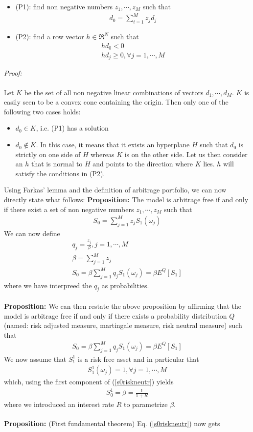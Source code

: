 \documentclass[a4paper,10pt]{report}
\theoremstyle{plain}
\theoremstyle{definition}
\newcommand\be{\begin{eqnarray}}    %
\newcommand\ee{\end{eqnarray}}
\newcommand{\PROP} {{\bf{Proposition: }}}
\newcommand{\PROOF} {{\emph{Proof: \\ \\}}}
\begin{document}
\begin{itemize}
\item (P1): find non negative numbers $z_1,\cdots, z_M$ such that 
\be 
d_0 = \sum_{i=1}^M z_j d_j
\ee
\item (P2): find a row vector $h\in \Re^N$ such that 
\be 
h d_0 <0 \\
h d_j \ge 0, \forall j=1,\cdots, M
\ee
\end{itemize} 
\PROOF Let $K$ be the set of all non negative linear combinations of vectors $d_1,\cdots, d_M$. $K$ is easily seen to be a convex cone containing the origin. Then only one of the following two cases holds:
\begin{itemize}
\item $d_0 \in K$, i.e. (P1) has a solution
\item  $d_0 \notin K$. In this case, it means that it exists an hyperplane $H$ such that $d_0$ is strictly on one side of $H$ whereas $K$ is on the other side. Let us then consider an $h$ that is normal to $H$ and points to the direction where $K$ lies. $h$ will satisfy the conditions in (P2).
\end{itemize}
Using Farkas' lemma and the definition of arbitrage portfolio, we can now directly state what follows:
\PROP The model is arbitrage free if and only if there exist a set of non negative numbers $z_1,\cdots, z_M$ such that 
\be 
S_0 = \sum_{j=1}^M z_j S_1(\omega_j)
\label{noarbitrages1sn}
\ee
We can now define 
\be 
q_j=\frac{z_j}{\beta}, j=1,\cdots, M \\
 \beta = \sum_{j=1}^M z_j \\
S_0 = \beta  \sum_{j=1}^M q_j S_1(\omega_j) = \beta E^Q\left[ S_1\right]
\ee
where we have interpreed the $q_j$ as probabilities. \\ \\
\PROP We can then restate the above proposition by affirming that the model is arbitrage free if and only if there exists a probability distribution $Q$ (named: risk adjusted measure, martingale measure, risk neutral measure) such that 
\be 
S_0 = \beta  \sum_{j=1}^M q_j S_1(\omega_j) = \beta E^Q\left[ S_1\right]
\label{s0riskneutr}
\ee
We now assume that $S_t^1$ is a risk free asset and in particular that 
\be 
S_1^1(\omega_j) = 1, \forall j=1,\cdots, M  
\ee
which, using the first component of (\ref{s0riskneutr}) yields
\be 
S_0^1 = \beta = \frac{1}{1+R}
\ee
where we introduced an interest rate $R$ to parametrize $\beta$. \\ \\ 
\PROP (First fundamental theorem) Eq. (\ref{s0riskneutr}) now gets
\end{document}
